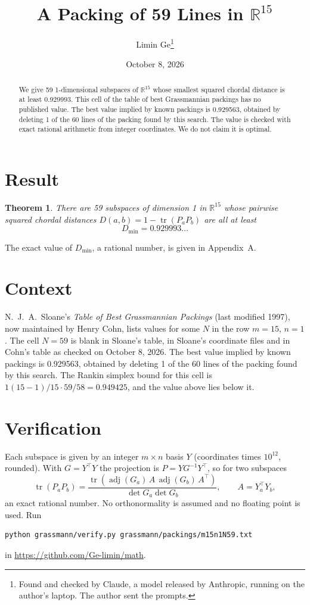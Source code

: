 \documentclass[11pt,a4paper]{article}
\title{A Packing of 59 Lines in $\mathbb{R}^{15}$}
\author{Limin Ge\thanks{Found and checked by Claude, a model released by Anthropic, running on the author's laptop. The author sent the prompts.}}
\date{October 8, 2026}
\newtheorem*{theorem}{Theorem}
\begin{document}
\maketitle
\begin{abstract}
We give 59 1-dimensional subspaces of $\mathbb{R}^{15}$ whose smallest squared chordal distance is at least 0.929993. This cell of the table of best Grassmannian packings has no published value. The best value implied by known packings is 0.929563, obtained by deleting 1 of the 60 lines of the packing found by this search. The value is checked with exact rational arithmetic from integer coordinates. We do not claim it is optimal.
\end{abstract}

\section{Result}
\begin{theorem}
There are 59 subspaces of dimension 1 in $\mathbb{R}^{15}$ whose pairwise squared chordal distances $D(a,b) = 1 - \operatorname{tr}(P_aP_b)$ are all at least
\[ D_{\min} = 0.929993\ldots \]
\end{theorem}
The exact value of $D_{\min}$, a rational number, is given in Appendix~A.


\section{Context}
N.~J.~A.~Sloane's \emph{Table of Best Grassmannian Packings} (last modified 1997), now maintained by Henry Cohn, lists values for some $N$ in the row $m=15$, $n=1$. The cell $N=59$ is blank in Sloane's table, in Sloane's coordinate files and in Cohn's table as checked on October 8, 2026. The best value implied by known packings is 0.929563, obtained by deleting 1 of the 60 lines of the packing found by this search. The Rankin simplex bound for this cell is $1(15-1)/15\cdot 59/58 = 0.949425$, and the value above lies below it.


\section{Verification}
Each subspace is given by an integer $m\times n$ basis $Y$ (coordinates times $10^{12}$, rounded). With $G=Y^\top Y$ the projection is $P=YG^{-1}Y^\top$, so for two subspaces
\[ \operatorname{tr}(P_aP_b)=\frac{\operatorname{tr}(\operatorname{adj}(G_a)\,A\,\operatorname{adj}(G_b)\,A^\top)}{\det G_a\det G_b},\qquad A=Y_a^\top Y_b, \]
an exact rational number. No orthonormality is assumed and no floating point is used. Run
\begin{verbatim}
python grassmann/verify.py grassmann/packings/m15n1N59.txt
\end{verbatim}
in \url{https://github.com/Ge-limin/math}.
\end{document}
